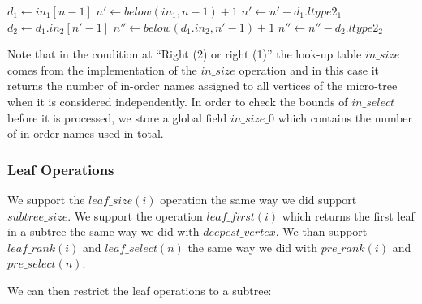 \begin{algorithmic}
	\State $d_1 \gets in_1[n - 1]$
	\State $n' \gets below(in_1, n - 1) + 1$
	 
		\State {}
	 
		\State {}
	\Else
		\State $n' \gets n' - d_1.ltype2_1$
		 
			\State {}
		\Else {}
			\State $d_2 \gets d_1.in_2[n' - 1]$
			\State $n'' \gets below(d_1.in_2, n' - 1) + 1$
			 
				\State {}
			 
				\State {}
			\Else
				\State $n'' \gets n'' - d_2.ltype2_2$
				 
					\State {}
				\Else
					\State {}
				\EndIf
			\EndIf
		\EndIf
	\EndIf
\EndFunction
\end{algorithmic}

Note that in the condition at ``Right (2) or right (1)'' the look-up table $in\_size$ comes from the implementation of the $in\_size$ operation and in this case it returns the number of in-order names assigned to all vertices of the micro-tree when it is considered independently.
In order to check the bounds of $in\_select$ before it is processed, we store a global field $in\_size\_0$ which contains the number of in-order names used in total.

\subsubsection{Leaf Operations}

We support the $leaf\_size(i)$ operation the same way we did support $subtree\_size$.
We support the operation $leaf\_first(i)$ which returns the first leaf in a subtree the same way we did with $deepest\_vertex$.
We than support $leaf\_rank(i)$ and $leaf\_select(n)$ the same way we did with $pre\_rank(i)$ and $pre\_select(n)$.

We can then restrict the leaf operations to a subtree:
\begin{algorithmic}
	\State {}
\EndFunction
\end{algorithmic}

